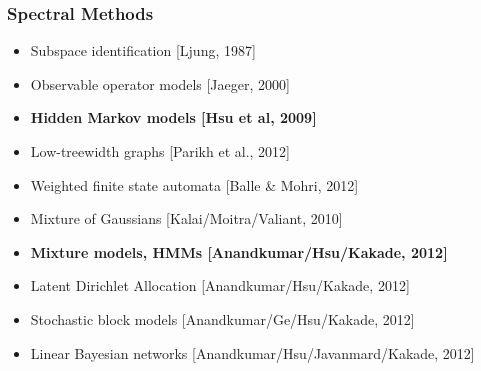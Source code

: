 \documentclass[xcolor={svgnames}]{beamer}
\begin{document}
\begin{frame}
  \frametitle{Spectral Methods}
  \begin{itemize}
    \item Subspace identification [Ljung, 1987]
    \item Observable operator models [Jaeger, 2000]
    \item {\bf Hidden Markov models [Hsu et al, 2009]}
    \item Low-treewidth graphs [Parikh et al., 2012]
    \item Weighted finite state automata [Balle \& Mohri, 2012]
  \end{itemize}
  \begin{itemize}
    \item Mixture of Gaussians [Kalai/Moitra/Valiant, 2010]
    \item {\bf Mixture models, HMMs [Anandkumar/Hsu/Kakade, 2012]}
    \item Latent Dirichlet Allocation [Anandkumar/Hsu/Kakade, 2012]
    \item Stochastic block models [Anandkumar/Ge/Hsu/Kakade, 2012]
    \item Linear Bayesian networks [Anandkumar/Hsu/Javanmard/Kakade, 2012]
  \end{itemize}
\end{frame}
\end{document}
